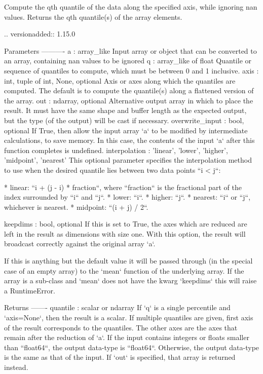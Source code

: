 \begin{DoxyVerb}Compute the qth quantile of the data along the specified axis,
while ignoring nan values.
Returns the qth quantile(s) of the array elements.

.. versionadded:: 1.15.0

Parameters
----------
a : array_like
    Input array or object that can be converted to an array, containing
    nan values to be ignored
q : array_like of float
    Quantile or sequence of quantiles to compute, which must be between
    0 and 1 inclusive.
axis : {int, tuple of int, None}, optional
    Axis or axes along which the quantiles are computed. The
    default is to compute the quantile(s) along a flattened
    version of the array.
out : ndarray, optional
    Alternative output array in which to place the result. It must
    have the same shape and buffer length as the expected output,
    but the type (of the output) will be cast if necessary.
overwrite_input : bool, optional
    If True, then allow the input array `a` to be modified by intermediate
    calculations, to save memory. In this case, the contents of the input
    `a` after this function completes is undefined.
interpolation : {'linear', 'lower', 'higher', 'midpoint', 'nearest'}
    This optional parameter specifies the interpolation method to
    use when the desired quantile lies between two data points
    ``i < j``:

    * linear: ``i + (j - i) * fraction``, where ``fraction``
      is the fractional part of the index surrounded by ``i``
      and ``j``.
    * lower: ``i``.
    * higher: ``j``.
    * nearest: ``i`` or ``j``, whichever is nearest.
    * midpoint: ``(i + j) / 2``.

keepdims : bool, optional
    If this is set to True, the axes which are reduced are left in
    the result as dimensions with size one. With this option, the
    result will broadcast correctly against the original array `a`.

    If this is anything but the default value it will be passed
    through (in the special case of an empty array) to the
    `mean` function of the underlying array.  If the array is
    a sub-class and `mean` does not have the kwarg `keepdims` this
    will raise a RuntimeError.

Returns
-------
quantile : scalar or ndarray
    If `q` is a single percentile and `axis=None`, then the result
    is a scalar. If multiple quantiles are given, first axis of
    the result corresponds to the quantiles. The other axes are
    the axes that remain after the reduction of `a`. If the input
    contains integers or floats smaller than ``float64``, the output
    data-type is ``float64``. Otherwise, the output data-type is the
    same as that of the input. If `out` is specified, that array is
    returned instead.


\end{DoxyVerb}
